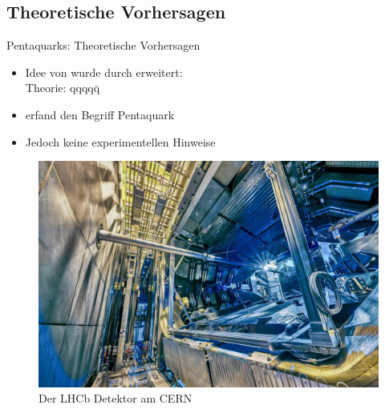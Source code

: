 \documentclass[aspectratio=169]{beamer} %
\begin{document}
    \subsection{Theoretische Vorhersagen}
    \begin{frame}{Pentaquarks: Theoretische Vorhersagen}
      \begin{minipage}{0.54\textwidth}
      \begin{itemize}
        \item Idee von \textcite{GellMann.1964} wurde durch \textcite{Hogaasen.1978, Strottman.1979} erweitert:
        \\
         \hspace{3mm} Theorie: $\mathrm{qqqq\bar{q}}$ \pause
         
         \item \textcite{Lipkin.1987} erfand den Begriff Pentaquark \pause
         \\[1em]
         \item Jedoch keine experimentellen Hinweise \pause %
      \end{itemize}
    \end{minipage}
\hfill
      \begin{minipage}{0.45\textwidth}
        \begin{figure}
          \centering
          \includegraphics[width=\linewidth, height=\textheight, keepaspectratio]{fsp-LHCb-geoeffneter-detektor-blick-seite-2018-copyright-Brice-Ordan-CERN.jpg}
          \caption{Der LHCb Detektor am CERN\\\scriptsize\cite[Foto © Maximilien Brice, Julien Ordan | CERN ][]{.BMBF}}
        \end{figure}
      \end{minipage}
        \hfill
    \end{frame}
\end{document}
